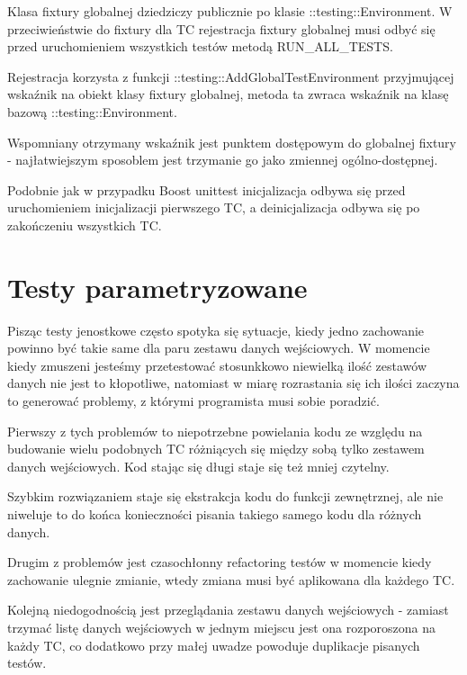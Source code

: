 \documentclass[12pt,a4paper,notitlepage]{report}
\begin{document}
Klasa fixtury globalnej dziedziczy publicznie po klasie ::testing::Environment. W przeciwieństwie do fixtury dla TC rejestracja fixtury globalnej musi odbyć się przed uruchomieniem wszystkich testów metodą RUN{\_}ALL{\_}TESTS.

Rejestracja korzysta z funkcji ::testing::AddGlobalTestEnvironment przyjmującej wskaźnik na obiekt klasy fixtury globalnej, metoda ta zwraca wskaźnik na klasę bazową ::testing::Environment. 

Wspomniany otrzymany wskaźnik jest punktem dostępowym do globalnej fixtury - najłatwiejszym sposoblem jest trzymanie go jako zmiennej ogólno-dostępnej.

Podobnie jak w przypadku Boost unittest inicjalizacja odbywa się przed uruchomieniem inicjalizacji pierwszego TC, a deinicjalizacja odbywa się po zakończeniu wszystkich TC.

			

\chapter{Testy parametryzowane}

Pisząc testy jenostkowe często spotyka się sytuacje, kiedy jedno zachowanie powinno być takie same dla paru zestawu danych wejściowych. W momencie kiedy zmuszeni jesteśmy przetestować stosunkkowo niewielką ilość zestawów danych nie jest to kłopotliwe, natomiast w miarę rozrastania się ich ilości zaczyna to generować problemy, z którymi programista musi sobie poradzić.

Pierwszy z tych problemów to niepotrzebne powielania kodu ze względu na budowanie wielu podobnych TC różniących się między sobą tylko zestawem danych wejściowych. Kod stając się długi staje się też mniej czytelny.

Szybkim rozwiązaniem staje się ekstrakcja kodu do funkcji zewnętrznej, ale nie niweluje to do końca konieczności pisania takiego samego kodu dla różnych danych.

Drugim z problemów jest czasochłonny refactoring testów w momencie kiedy zachowanie ulegnie zmianie, wtedy zmiana musi być aplikowana dla każdego TC.

Kolejną niedogodnością jest przeglądania zestawu danych wejściowych - zamiast trzymać listę danych wejściowych w jednym miejscu jest ona rozporoszona na każdy TC, co dodatkowo przy małej uwadze powoduje duplikacje pisanych testów.
\end{document}
